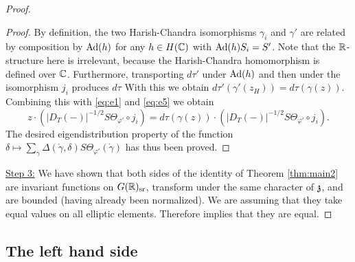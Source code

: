\documentclass{article}
\theoremstyle{definition}
\numberwithin{equation}{section}
\renewcommand{\-}{\hyp{}}
\newcommand{\warn}[1]{{\leavevmode\color{red}[#1]}}
\begin{document}
\begin{proof}
\begin{proof}
		By definition, the two Harish-Chandra isomorphisms $\gamma_i$ and $\gamma'$ are related by composition by $\textrm{Ad}(h)$ for any $h \in H(\mathbb{C})$ with $\textrm{Ad}(h)S_i=S'$. Note that the $\mathbb{R}$-structure here is irrelevant, because the Harish-Chandra homomorphism is defined over $\mathbb{C}$. Furthermore, transporting $d\tau'$ under $\textrm{Ad}(h)$ and then under the isomorphism $j_i$ produces $d\tau$ 
		With this we obtain $d\tau'(\gamma'(z_H))=d\tau(\gamma(z))$. Combining this with \eqref{eq:e1} and \eqref{eq:e5} we obtain
		\[  z \cdot (|D_T(-)|^{-1/2}S\Theta_{\varphi'}\circ j_i) = d\tau(\gamma(z)) \cdot (|D_T(-)|^{-1/2}S\Theta_{\varphi'}\circ j_i). \] 
		The desired eigendistribution property of the function $\delta \mapsto \sum_\gamma \Delta(\dot\gamma,\delta)S\Theta_{\varphi'}(\dot\gamma)$ has thus been proved.
	\end{proof}




	\underline{Step 3:} We have shown that both sides of the identity of Theorem \ref{thm:main2} are invariant functions on $G(\mathbb{R})_{\textrm{sr}}$, transform under the same character of $\mathfrak{z}$, and are bounded (having already been normalized). We are assuming that they take equal values on all elliptic elements. Therefore \cite[Lemma 44]{HCDSI} implies that they are equal.
\end{proof}

\subsection{The left hand side}


\end{document}
